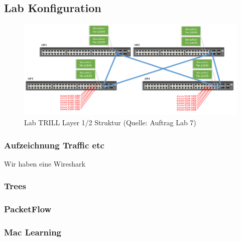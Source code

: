 \subsection{Lab Konfiguration}
\begin{figure}[h]
	\centering
	\includegraphics[width=1\linewidth]{trill_network_layer2}
	\caption{Lab TRILL Layer 1/2 Struktur (Quelle: Auftrag Lab 7)}
	\label{fig:trillnetworklayer2}
\end{figure}

\subsubsection{Aufzeichnung Traffic etc}

Wir haben eine Wireshark


\subsubsection{Trees}



\subsubsection{PacketFlow}

\subsubsection{Mac Learning}

